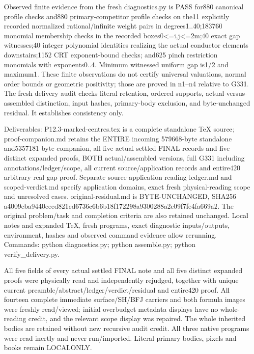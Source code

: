 Observed finite evidence from the fresh diagnostics.py is PASS for880 canonical profile checks and880 primary-competitor profile checks on the11 explicitly recorded normalized rational/infinite weight pairs in degrees1..40;183760 monomial membership checks in the recorded boxes0\textless{}=i,j\textless{}=2m;40 exact gap witnesses;40 integer polynomial identities realizing the actual conductor elements downstairs;1152 CRT exponent-bound checks; and625 pinch restriction monomials with exponents0..4. Minimum witnessed uniform gap is1/2 and maximum1. These finite observations do not certify universal valuations, normal order bounds or geometric positivity; those are proved in n1--n4 relative to G331. The fresh delivery audit checks literal retention, ordered supports, actual-versus-assembled distinction, input hashes, primary-body exclusion, and byte-unchanged residual. It establishes consistency only.

Deliverables: P12.3-marked-centres.tex is a complete standalone TeX source; proof-companion.md retains the ENTIRE incoming 579668-byte standalone and5357181-byte companion, all five actual settled FINAL records and five distinct expanded proofs, BOTH actual/assembled versions, full G331 including annotations/ledger/scope, all current source/application records and entire420 arbitrary-real-gap proof. Separate source-application-reading-ledger.md and scoped-verdict.md specify application domains, exact fresh physical-reading scope and unresolved cases. original-residual.md is BYTE-UNCHANGED, SHA256 a4009cba9440ceed821cd6736c6b6b18f172298a9300288a2c09f7fe4fa669a2. The original problem/task and completion criteria are also retained unchanged. Local notes and expanded TeX, fresh programs, exact diagnostic inputs/outputs, environment, hashes and observed command evidence allow rerunning. Commands: python diagnostics.py; python assemble.py; python verify\_delivery.py.

All five fields of every actual settled FINAL note and all five distinct expanded proofs were physically read and independently rejudged, together with unique current preamble/abstract/ledger/verdict/residual and entire420 proof. All fourteen complete immediate surface/SH/BFJ carriers and both formula images were freshly read/viewed; initial overbudget metadata displays have no whole-reading credit, and the relevant scope display was repaired. The whole inherited bodies are retained without new recursive audit credit. All three native programs were read inertly and never run/imported. Literal primary bodies, pixels and books remain LOCALONLY.

